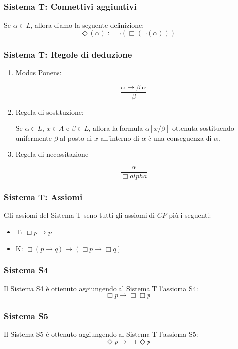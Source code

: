 \documentclass[notheorem]{beamer}
\begin{document}
\begin{frame}
\frametitle{Sistema T: Connettivi aggiuntivi}
Se $\alpha \in L$, allora diamo la seguente definizione:
$$\Diamond (\alpha) := \neg(\Box(\neg(\alpha)))$$
\end{frame}

\begin{frame}
\frametitle{Sistema T: Regole di deduzione}
\begin{enumerate}
\item Modus Ponens:

$$\frac{\alpha \rightarrow \beta \ \alpha}{\beta}$$

\item Regola di sostituzione:

Se $\alpha \in L$, $x \in A$ e $\beta \in L$, allora
la formula $\alpha[x/\beta]$ ottenuta sostituendo uniformente $\beta$ al posto di $x$
all'interno di $\alpha$ è una conseguenza di $\alpha$.

\item {\color{red} Regola di necessitazione:

$$\frac{\alpha}{\Box alpha}$$}
\end{enumerate}
\end{frame}


\begin{frame}
\frametitle{Sistema T: Assiomi}
Gli assiomi del Sistema T sono tutti gli assiomi di $CP$ più i seguenti:
\begin{itemize}
\item T: $\Box p \rightarrow p$
\item K: $\Box(p \rightarrow q) \rightarrow (\Box p \rightarrow \Box q)$
\end{itemize}
\end{frame}

\begin{frame}
\frametitle{Sistema S4}
Il Sistema S4 è ottenuto aggiungendo al Sistema T l'assioma S4:
$$\Box p \rightarrow \Box \Box p$$
\end{frame}

\begin{frame}
\frametitle{Sistema S5}
Il Sistema S5 è ottenuto aggiungendo al Sistema T l'assioma S5:
$$\Diamond p \rightarrow \Box \Diamond p$$
\end{frame}
\end{document}
